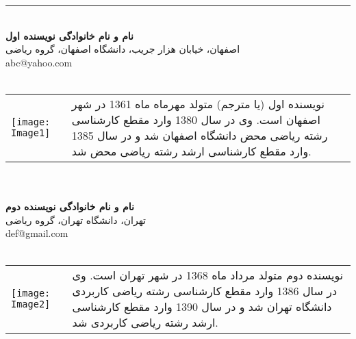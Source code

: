 \documentclass[11pt, twoside]{imsproc}
\begin{document}
\noindent \rule{.4\linewidth}{0.8pt}\\
\noindent\footnotesize{\bfseries نام و نام خانوادگی نویسنده اول} \\
\footnotesize{اصفهان، خيابان هزار جريب، دانشگاه اصفهان، گروه ریاضی } \\
abc@yahoo.com\\\\
\begin{tabular}{p{2 cm} p{14 cm} }
\texttt{[image: Image1]} 
&\vspace{-1.5cm}
\footnotesize

نویسنده اول (یا مترجم) متولد مهرماه ماه 1361 در شهر اصفهان است. وی در سال 1380 وارد مقطع كارشناسی رشته رياضی محض دانشگاه اصفهان شد و در سال 1385 وارد مقطع كارشناسی ارشد رشته رياضی محض شد.\\
\end{tabular}\\\\
\noindent\footnotesize{\bfseries نام و نام خانوادگی نویسنده دوم } \\
\footnotesize{تهران، دانشگاه تهران، گروه ریاضی } \\
 def@gmail.com\\\\
\begin{tabular}{p{2 cm} p{14 cm} }
\texttt{[image: Image2]} 
&\vspace{-1.5cm}
\footnotesize

نویسنده دوم متولد مرداد ماه 1368 در شهر تهران است. وی در سال 1386 وارد مقطع كارشناسی رشته رياضی كاربردی دانشگاه تهران شد و در سال 1390  وارد مقطع كارشناسی ارشد رشته رياضی كاربردی شد.
\end{tabular}
\end{document}

